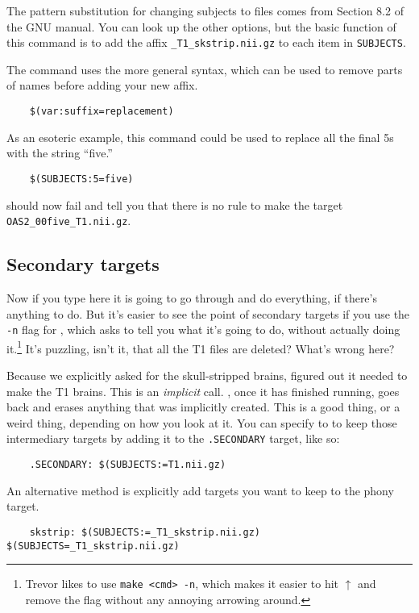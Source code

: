 The pattern substitution for changing subjects to files comes from Section 8.2 of the GNU \maken{} manual. You can look up the other options, but the basic function of this command is to add the affix \texttt{_T1_skstrip.nii.gz} to each item in \texttt{SUBJECTS}. 

The command uses the more general syntax, which can be used to remove parts of names before adding your new affix.
\begin{lstlisting}
	$(var:suffix=replacement)
\end{lstlisting}

As an esoteric example, this command could be used to replace all the final 5s with the string ``five.''
\begin{lstlisting}
	$(SUBJECTS:5=five)
\end{lstlisting}

\maken{} should now fail and tell you that there is no rule to make the target \texttt{OAS2_00five_T1.nii.gz}.

\subsection{Secondary targets}

Now if you type \maken{} here it is going to go through and do everything, if there's anything to do. But it's easier to see the point of secondary targets if you use the \texttt{-n} flag for \maken{}, which asks \maken{} to tell you what it's going to do, without actually doing it.\footnote{Trevor likes to use \texttt{make <cmd> -n}, which makes it easier to hit $\uparrow$ and remove the flag without any annoying arrowing around.} It's puzzling, isn't it, that all the T1 files are deleted? What's wrong here?

Because we explicitly asked for the skull-stripped brains, \maken{} figured out it needed to make the T1 brains. This is an \emph{implicit} call. \maken, once it has finished running, goes back and erases anything that was implicitly created. This is a good thing, or a weird thing, depending on how you look at it. You can specify to \maken{} to keep those intermediary targets by adding it to the \texttt{.SECONDARY} target, like so:
\begin{lstlisting}
	.SECONDARY: $(SUBJECTS:=T1.nii.gz)
\end{lstlisting}

An alternative method is explicitly add targets you want to keep to
the phony target.
\begin{lstlisting}
	skstrip: $(SUBJECTS:=_T1_skstrip.nii.gz) $(SUBJECTS=_T1_skstrip.nii.gz)
\end{lstlisting}

